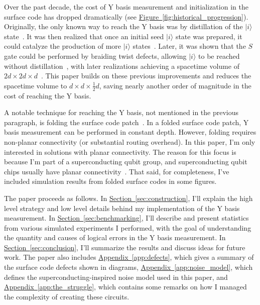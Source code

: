 \documentclass[onecolumn,unpublished,a4paper]{quantumarticle}
\theoremstyle{definition}
\theoremstyle{definition}
\theoremstyle{definition}
\renewcommand{\sec}[1]{\hyperref[sec:#1]{Section~\ref*{sec:#1}}}
\DeclareRobustCommand{\app}[1]{\hyperref[app:#1]{Appendix~\ref*{app:#1}}}
\newcommand{\fig}[1]{\hyperref[fig:#1]{Figure~\ref*{fig:#1}}}
\begin{document}
Over the past decade, the cost of Y basis measurement and initialization in the surface code has dropped dramatically (see \fig{historical_progression}).
Originally, the only known way to reach the Y basis was by distillation of the $|i\rangle$ state~\cite{aliferis2005quantum,fowler2012surfacecodereview,fowler2012bridge}.
It was then realized that once an initial seed $|i\rangle$ state was prepared, it could catalyze the production of more $|i\rangle$ states~\cite{fowler2012surfacecodereview,gidney2017slightly}.
Later, it was shown that the $S$ gate could be performed by braiding twist defects, allowing $|i\rangle$ to be reached without distillation~\cite{brown2017surfacetwists}, with later realizations achieving a spacetime volume of $2d \times 2d \times d$~\cite{bombin2021logical,chamberland2022universal}.
This paper builds on these previous improvements and reduces the spacetime volume to $d \times d \times \frac{1}{2}d$, saving nearly another order of magnitude in the cost of reaching the Y basis.

A notable technique for reaching the Y basis, not mentioned in the previous paragraph, is folding the surface code patch~\cite{Kubica2015unfoldcolorcode,moussa2016folded}.
In a folded surface code patch, Y basis measurement can be performed in constant depth.
However, folding requires non-planar connectivity (or substantial routing overhead).
In this paper, I'm only interested in solutions with planar connectivity.
The reason for this focus is because I'm part of a superconducting qubit group, and superconducting qubit chips usually have planar connectivity~\cite{Andersen2020,googlerepcode2021,Zhao2022}.
That said, for completeness, I've included simulation results from folded surface codes in some figures.

The paper proceeds as follows.
In \sec{construction}, I'll explain the high level strategy and low level details behind my implementation of the Y basis measurement.
In \sec{benchmarking}, I'll describe and present statistics from various simulated experiments I performed, with the goal of understanding the quantity and causes of logical errors in the Y basis measurement.
In \sec{conclusion}, I'll summarize the results and discuss ideas for future work.
The paper also includes \app{defects}, which gives a summary of the surface code defects shown in diagrams, \app{noise_model}, which defines the superconducting-inspired noise model used in this paper, and \app{the_struggle}, which contains some remarks on how I managed the complexity of creating these circuits.
\end{document}
